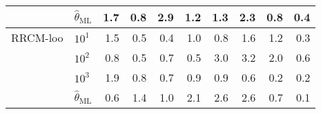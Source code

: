 \documentclass[a4paper,14pt]{extarticle}
\begin{document}
\begin{table}
\begin{tabular}{ll||rrrr|rrrr}
       & $\hat{\theta}_\text{ML}$ &      1.7 &      0.8 &      2.9 &      1.2 &      1.3 &      2.3 &      0.8 &      0.4 \\
  \midrule
  RRCM-loo & $10^1$ &      1.5 &      0.5 &      0.4 &      1.0 &      0.8 &      1.6 &      1.2 &      0.3 \\
       & $10^2$ &      0.8 &      0.5 &      0.7 &      0.5 &      3.0 &      3.2 &      2.0 &      0.6 \\
       & $10^3$ &      1.9 &      0.8 &      0.7 &      0.9 &      0.9 &      0.6 &      0.2 &      0.2 \\
       & $\hat{\theta}_\text{ML}$ &      0.6 &      1.4 &      1.0 &      2.1 &      2.6 &      2.6 &      0.7 &      0.1 \\
  \bottomrule
  \end{tabular}
\end{table}
\end{document}
